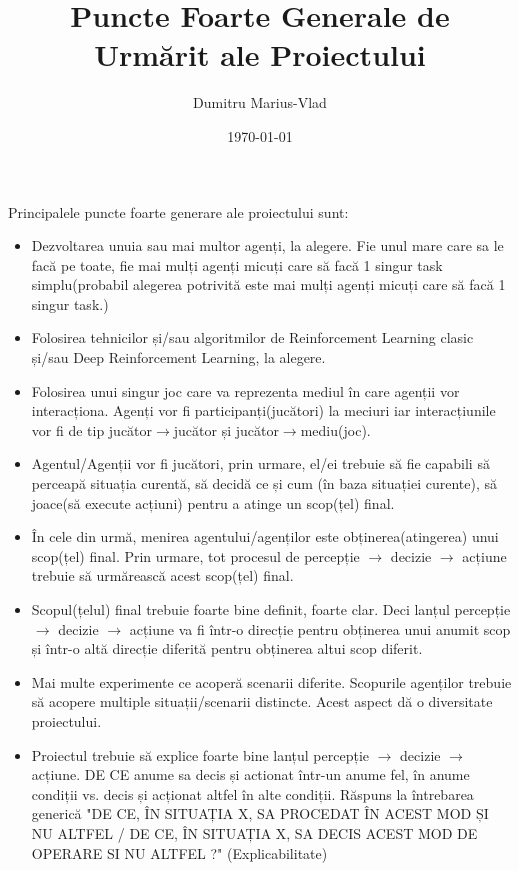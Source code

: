 \documentclass[12pt]{article}
\title{Puncte Foarte Generale de Urmărit ale Proiectului}
\author{Dumitru Marius-Vlad}
\date{\today}
\begin{document}
\maketitle

Principalele puncte foarte generare ale proiectului sunt:
    \begin{itemize}
        \item Dezvoltarea unuia sau mai multor agenți, la alegere. Fie unul mare care sa le facă pe toate, fie mai mulți agenți micuți care să facă 1 singur task simplu(probabil alegerea potrivită este mai mulți agenți micuți care să facă 1 singur task.)
        \item Folosirea tehnicilor și/sau algoritmilor de Reinforcement Learning clasic și/sau Deep Reinforcement Learning, la alegere.
        \item Folosirea unui singur joc care va reprezenta mediul în care agenții vor interacționa. Agenți vor fi participanți(jucători) la meciuri iar interacțiunile vor fi de tip jucător$\rightarrow$jucător și jucător$\rightarrow$mediu(joc).
        \item Agentul/Agenții vor fi jucători, prin urmare, el/ei trebuie să fie capabili să perceapă situația curentă, să decidă ce și cum (în baza situației curente), să joace(să execute acțiuni) pentru a atinge un scop(țel) final.
        \item În cele din urmă, menirea agentului/agenților este obținerea(atingerea) unui scop(țel) final. Prin urmare, tot procesul de percepție $\rightarrow$ decizie $\rightarrow$ acțiune trebuie să urmărească acest scop(țel) final.
        \item Scopul(țelul) final trebuie foarte bine definit, foarte clar. Deci lanțul percepție $\rightarrow$ decizie $\rightarrow$ acțiune va fi într-o direcție pentru obținerea unui anumit scop și într-o altă direcție diferită pentru obținerea altui scop diferit.
        \item Mai multe experimente ce acoperă scenarii diferite. Scopurile agenților trebuie să acopere multiple situații/scenarii distincte. Acest aspect dă o diversitate proiectului.
        \item Proiectul trebuie să explice foarte bine lanțul percepție $\rightarrow$ decizie $\rightarrow$ acțiune. DE CE anume sa decis și actionat într-un anume fel, în anume condiții vs. decis și acționat altfel în alte condiții. Răspuns la întrebarea generică "DE CE, ÎN SITUAȚIA X, SA PROCEDAT ÎN ACEST MOD ȘI NU ALTFEL / DE CE, ÎN SITUAȚIA X, SA DECIS ACEST MOD DE OPERARE SI NU ALTFEL ?" (Explicabilitate)

\end{itemize}
\end{document}
